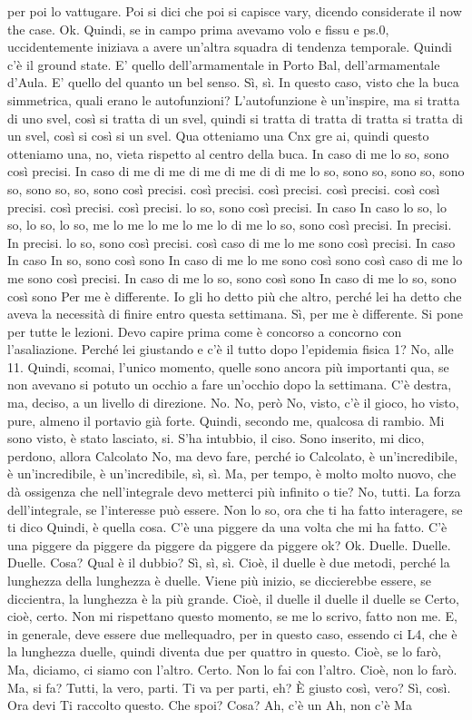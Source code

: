 \begin{soluzione}
   per poi lo vattugare. Poi si dici che poi si capisce vary, dicendo considerate il now the case. Ok. Quindi, se in campo prima avevamo volo e fissu e ps.0, uccidentemente iniziava a avere un'altra squadra di tendenza temporale. Quindi c'è il ground state. E' quello dell'armamentale in Porto Bal, dell'armamentale d'Aula. E' quello del quanto un bel senso. Sì, sì. In questo caso, visto che la buca simmetrica, quali erano le autofunzioni? L'autofunzione è un'inspire, ma si tratta di uno svel, così si tratta di un svel, quindi si tratta di tratta di tratta si tratta di un svel, così si così si un svel. Qua otteniamo una Cnx gre ai, quindi questo otteniamo una, no, vieta rispetto al centro della buca. In caso di me lo so, sono così precisi. In caso di me di me di me di me di di me lo so, sono so, sono so, sono so, sono so, so, sono così precisi. così precisi. così precisi. così precisi. così così precisi. così precisi. così precisi. lo so, sono così precisi. In caso In caso lo so, lo so, lo so, lo so, me lo me lo me lo me lo di me lo so, sono così precisi. In precisi. In precisi. lo so, sono così precisi. così caso di me lo me sono così precisi. In caso In caso In so, sono così sono In caso di me lo me sono così sono così caso di me lo me sono così precisi. In caso di me lo so, sono così sono In caso di me lo so, sono così sono Per me è differente. Io gli ho detto più che altro, perché lei ha detto che aveva la necessità di finire entro questa settimana. Sì, per me è differente. Si pone per tutte le lezioni. Devo capire prima come è concorso a concorno con l'asaliazione. Perché lei giustando e c'è il tutto dopo l'epidemia fisica 1? No, alle 11. Quindi, scomai, l'unico momento, quelle sono ancora più importanti qua, se non avevano si potuto un occhio a fare un'occhio dopo la settimana. C'è destra, ma, deciso, a un livello di direzione. No. No, però No, visto, c'è il gioco, ho visto, pure, almeno il portavio già forte. Quindi, secondo me, qualcosa di rambio. Mi sono visto, è stato lasciato, si. S'ha intubbio, il ciso. Sono inserito, mi dico, perdono, allora Calcolato No, ma devo fare, perché io Calcolato, è un'incredibile, è un'incredibile, è un'incredibile, sì, sì. Ma, per tempo, è molto molto nuovo, che dà ossigenza che nell'integrale devo metterci più infinito o tie? No, tutti. La forza dell'integrale, se l'interesse può essere. Non lo so, ora che ti ha fatto interagere, se ti dico Quindi, è quella cosa. C'è una piggere da una volta che mi ha fatto. C'è una piggere da piggere da piggere da piggere da piggere ok? Ok. Duelle. Duelle. Duelle. Cosa? Qual è il dubbio? Sì, sì, sì. Cioè, il duelle è due metodi, perché la lunghezza della lunghezza è duelle. Viene più inizio, se diccierebbe essere, se diccientra, la lunghezza è la più grande. Cioè, il duelle il duelle il duelle se Certo, cioè, certo. Non mi rispettano questo momento, se me lo scrivo, fatto non me. E, in generale, deve essere due mellequadro, per in questo caso, essendo ci L4, che è la lunghezza duelle, quindi diventa due per quattro in questo. Cioè, se lo farò, Ma, diciamo, ci siamo con l'altro. Certo. Non lo fai con l'altro. Cioè, non lo farò. Ma, si fa? Tutti, la vero, parti. Ti va per parti, eh? È giusto così, vero? Sì, così. Ora devi Ti raccolto questo. Che spoi? Cosa? Ah, c'è un Ah, non c'è Ma 
\end{soluzione}
